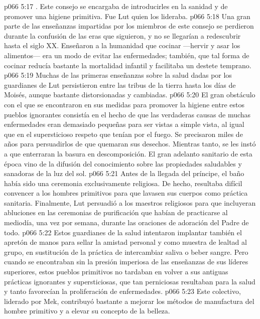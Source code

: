 \vs p066 5:17 . Este consejo se encargaba de introducirles en la sanidad y de promover una higiene primitiva. Fue Lut quien los lideraba.
\vs p066 5:18 Una gran parte de las enseñanzas impartidas por los miembros de este consejo se perdieron durante la confusión de las eras que siguieron, y no se llegarían a redescubrir hasta el siglo XX. Enseñaron a la humanidad que cocinar ---hervir y asar los alimentos--- era un modo de evitar las enfermedades; también, que tal forma de cocinar reducía bastante la mortalidad infantil y facilitaba un destete temprano.
\vs p066 5:19 Muchas de las primeras enseñanzas sobre la salud dadas por los guardianes de Lut persistieron entre las tribus de la tierra hasta los días de Moisés, aunque bastante distorsionadas y cambiadas.
\vs p066 5:20 El gran obstáculo con el que se encontraron en sus medidas para promover la higiene entre estos pueblos ignorantes consistía en el hecho de que las verdaderas causas de muchas enfermedades eran demasiado pequeñas para ser vistas a simple vista, al igual que en el supersticioso respeto que tenían por el fuego. Se precisaron miles de años para persuadirlos de que quemaran sus desechos. Mientras tanto, se les instó a que enterraran la basura en descomposición. El gran adelanto sanitario de esta época vino de la difusión del conocimiento sobre las propiedades saludables y sanadoras de la luz del sol.
\vs p066 5:21 Antes de la llegada del príncipe, el baño había sido una ceremonia exclusivamente religiosa. De hecho, resultaba difícil convencer a los hombres primitivos para que lavasen sus cuerpos como práctica sanitaria. Finalmente, Lut persuadió a los maestros religiosos para que incluyeran abluciones en las ceremonias de purificación que habían de practicarse al mediodía, una vez por semana, durante las oraciones de adoración del Padre de todo.
\vs p066 5:22 Estos guardianes de la salud intentaron implantar también el apretón de manos para sellar la amistad personal y como muestra de lealtad al grupo, en sustitución de la práctica de intercambiar saliva o beber sangre. Pero cuando se encontraban sin la presión imperiosa de las enseñanzas de sus líderes superiores, estos pueblos primitivos no tardaban en volver a sus antiguas prácticas ignorantes y supersticiosas, que tan perniciosas resultaban para la salud y tanto favorecían la proliferación de enfermedades.
\vs p066 5:23  Este colectivo, liderado por Mek, contribuyó bastante a mejorar los métodos de manufactura del hombre primitivo y a elevar su concepto de la belleza.
